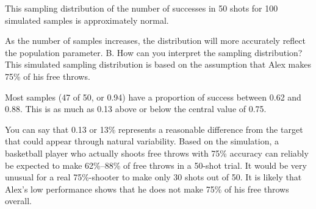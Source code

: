 \documentclass{article}
\newenvironment{example}[1]{}{}         %
\newcommand{\answer}[1]{}               %
\newcommand{\placeholder}[2]{}          %
\newcommand{\te}[1]{}                   %
\begin{document}
\begin{example}{3}
This sampling distribution of the number of successes in 50 shots for 100 simulated samples is approximately normal.
\placeholder{graph}{Successes out of 50 Trials: pale blue histogram. Horizontal Number of Successes labels 30 through 44 every 2 with unit-width bars centered at integers 30 through 44. Vertical Number of Samples 0 to 20 every 4. Approximate heights 3,2,3,5,10,11,9,9,16,12,8,3,5,3,1. Red downward arrow at 37.5 labeled 0.75.}
\te{Callout: Most sample proportions are clustered near the 75\% success rate, but many random samples have different proportions of successes.}
As the number of samples increases, the distribution will more accurately reflect the population parameter.
B. How can you interpret the sampling distribution?
This simulated sampling distribution is based on the assumption that Alex makes 75\% of his free throws.
\placeholder{graph}{Successes out of 50 Trials repeats the pale blue histogram, horizontal Number of Successes labels 30–44 every 2, vertical Number of Samples 0–20 every 4, unit-width bars with approximate heights 3,2,3,5,10,11,9,9,16,12,8,3,5,3,1. Red rectangle includes bars 31–44; downward red arrow at 37.5 labeled 0.75. Blue arrow near 31 labeled 31/50=0.62; green arrow near 44 labeled 44/50=0.88.}
\te{Callout: Only 3 out of 100 samples in this example matched Alex's 30 successes in 50 trials.}
Most samples (47 of 50, or 0.94) have a proportion of success between 0.62 and 0.88. This is as much as 0.13 above or below the central value of 0.75.
\te{Printed 47 of 50 after describing 100 simulated samples; the histogram's approximate bar counts also do not total 100.}
\te{Callout: Select a range of data that is centered on the mean and includes about 95\% of the samples.}
You can say that 0.13 or 13\% represents a reasonable difference from the target that could appear through natural variability.
Based on the simulation, a basketball player who actually shoots free throws with 75\% accuracy can reliably be expected to make 62\%–88\% of free throws in a 50-shot trial.
It would be very unusual for a real 75\%-shooter to make only 30 shots out of 50. It is likely that Alex's low performance shows that he does not make 75\% of his free throws overall.
\te{COMMON ERROR Do not assume that Alex's “true” free-throw percentage must be less than 75\%. It is unlikely, but it is still possible that his lower actual success rate of 60\% is due to chance, or other adverse factors.}
\answer{B. A reasonable range is 62\%–88\%; it is likely that Alex does not make 75\% of his free throws overall.}
\end{example}
\end{document}
